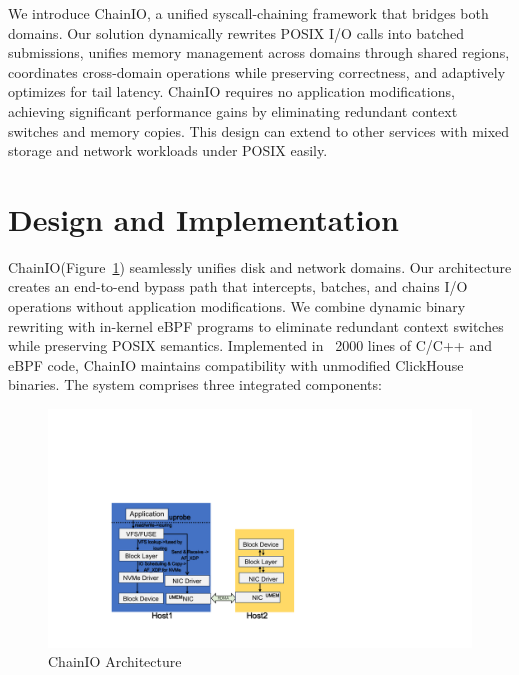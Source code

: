 \documentclass[sigconf,10pt]{acmart}
\newcommand{\sys}{ChainIO\xspace}
\begin{document}
We introduce \sys, a unified syscall-chaining framework that bridges both domains. Our solution dynamically rewrites POSIX I/O calls into batched submissions, unifies memory management across domains through shared regions, coordinates cross-domain operations while preserving correctness, and adaptively optimizes for tail latency. \sys requires no application modifications, achieving significant performance gains by eliminating redundant context switches and memory copies. This design can extend to other services with mixed storage and network workloads under POSIX easily.

\section{Design and Implementation}\label{sec:design-impl}

\sys (Figure~\ref{fig:bur}) seamlessly unifies disk and network domains. Our architecture creates an end-to-end bypass path that intercepts, batches, and chains I/O operations without application modifications. We combine dynamic binary rewriting with in-kernel eBPF programs to eliminate redundant context switches while preserving POSIX semantics. Implemented in ~2000 lines of C/C++ and eBPF code, \sys maintains compatibility with unmodified ClickHouse binaries. The system comprises three integrated components:

\begin{figure}[h]
\centering
\includegraphics[width=\columnwidth]{img/bur.pdf}
\caption{\sys Architecture}\label{fig:bur}
\end{figure}
\end{document}
